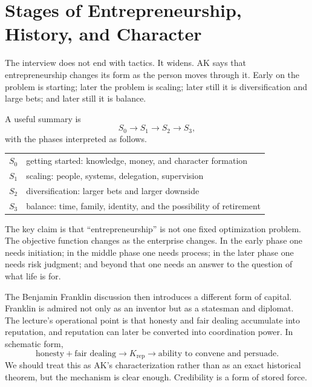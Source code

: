 \section{Stages of Entrepreneurship, History, and Character}

The interview does not end with tactics. It widens. AK says that entrepreneurship changes its form as the person moves through it. Early on the problem is starting; later the problem is scaling; later still it is diversification and large bets; and later still it is balance.

A useful summary is
\begin{equation}
S_0 \to S_1 \to S_2 \to S_3,
\end{equation}
with the phases interpreted as follows.

\begin{table}[h]
\centering
\begin{tabular}{ll}
\(S_0\) & getting started: knowledge, money, and character formation \\
\(S_1\) & scaling: people, systems, delegation, supervision \\
\(S_2\) & diversification: larger bets and larger downside \\
\(S_3\) & balance: time, family, identity, and the possibility of retirement
\end{tabular}
\end{table}

The key claim is that ``entrepreneurship'' is not one fixed optimization problem. The objective function changes as the enterprise changes. In the early phase one needs initiation; in the middle phase one needs process; in the later phase one needs risk judgment; and beyond that one needs an answer to the question of what life is for.

The Benjamin Franklin discussion then introduces a different form of capital. Franklin is admired not only as an inventor but as a statesman and diplomat. The lecture's operational point is that honesty and fair dealing accumulate into reputation, and reputation can later be converted into coordination power. In schematic form,
\begin{equation}
\text{honesty} + \text{fair dealing} \longrightarrow K_{\text{rep}} \longrightarrow \text{ability to convene and persuade}.
\end{equation}
We should treat this as AK's characterization rather than as an exact historical theorem, but the mechanism is clear enough. Credibility is a form of stored force.

